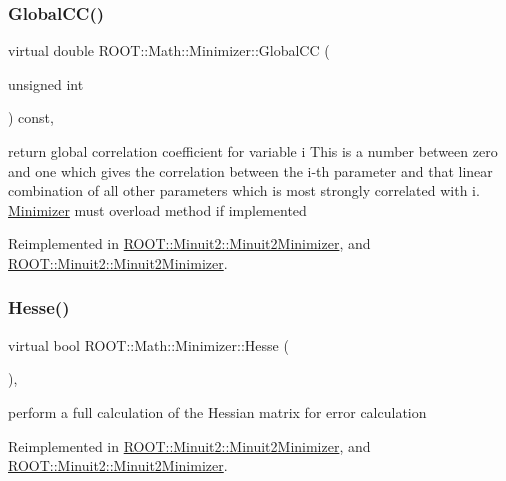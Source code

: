 \subsubsection{\texorpdfstring{GlobalCC()}{GlobalCC()}\hspace{0.1cm}{\footnotesize\ttfamily [2/2]}}
{\footnotesize\ttfamily virtual double R\+O\+O\+T\+::\+Math\+::\+Minimizer\+::\+Global\+CC (\begin{DoxyParamCaption}\item[{unsigned int}]{ }\end{DoxyParamCaption}) const\hspace{0.3cm}{\ttfamily [inline]}, {\ttfamily [virtual]}}

return global correlation coefficient for variable i This is a number between zero and one which gives the correlation between the i-\/th parameter and that linear combination of all other parameters which is most strongly correlated with i. \mbox{\hyperlink{classROOT_1_1Math_1_1Minimizer}{Minimizer}} must overload method if implemented 

Reimplemented in \mbox{\hyperlink{classROOT_1_1Minuit2_1_1Minuit2Minimizer_adde21edb0a67e0eef950049528cfb9a7}{R\+O\+O\+T\+::\+Minuit2\+::\+Minuit2\+Minimizer}}, and \mbox{\hyperlink{classROOT_1_1Minuit2_1_1Minuit2Minimizer_adde21edb0a67e0eef950049528cfb9a7}{R\+O\+O\+T\+::\+Minuit2\+::\+Minuit2\+Minimizer}}.

\mbox{\label{classROOT_1_1Math_1_1Minimizer_ae903e5936bef4ea7fac3301f9cdc50be}} 
\subsubsection{\texorpdfstring{Hesse()}{Hesse()}\hspace{0.1cm}{\footnotesize\ttfamily [1/2]}}
{\footnotesize\ttfamily virtual bool R\+O\+O\+T\+::\+Math\+::\+Minimizer\+::\+Hesse (\begin{DoxyParamCaption}{ }\end{DoxyParamCaption})\hspace{0.3cm}{\ttfamily [inline]}, {\ttfamily [virtual]}}

perform a full calculation of the Hessian matrix for error calculation 

Reimplemented in \mbox{\hyperlink{classROOT_1_1Minuit2_1_1Minuit2Minimizer_a0cfd04fde73c157de423705625ede51c}{R\+O\+O\+T\+::\+Minuit2\+::\+Minuit2\+Minimizer}}, and \mbox{\hyperlink{classROOT_1_1Minuit2_1_1Minuit2Minimizer_a0cfd04fde73c157de423705625ede51c}{R\+O\+O\+T\+::\+Minuit2\+::\+Minuit2\+Minimizer}}.

